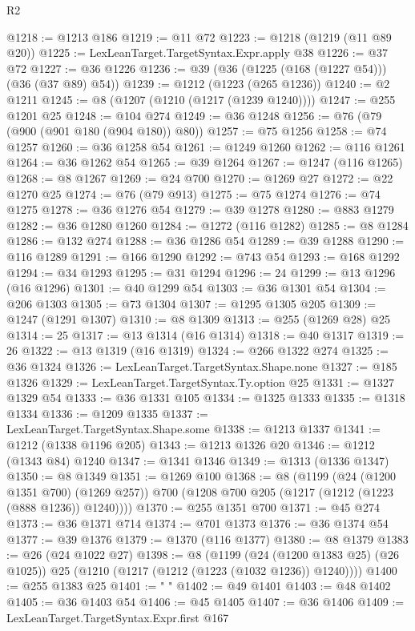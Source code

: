 \begin{lexlean}{R2}
\begin{coremodule}
@1218 := @1213 @186
@1219 := @11 @72
@1223 := @1218 (@1219 (@11 @89 @20))
@1225 := LexLeanTarget.TargetSyntax.Expr.apply @38
@1226 := @37 @72
@1227 := @36 @1226
@1236 := @39 (@36 (@1225 (@168 (@1227 @54))) (@36 (@37 @89) @54))
@1239 := @1212 (@1223 (@265 @1236))
@1240 := @2 @1211
@1245 := @8 (@1207 (@1210 (@1217 (@1239 @1240))))
@1247 := @255 @1201 @25
@1248 := @104 @274
@1249 := @36 @1248
@1256 := @76 (@79 (@900 (@901 @180 (@904 @180)) @80))
@1257 := @75 @1256
@1258 := @74 @1257
@1260 := @36 @1258 @54
@1261 := @1249 @1260
@1262 := @116 @1261
@1264 := @36 @1262 @54
@1265 := @39 @1264
@1267 := @1247 (@116 @1265)
@1268 := @8 @1267
@1269 := @24 @700
@1270 := @1269 @27
@1272 := @22 @1270 @25
@1274 := @76 (@79 @913)
@1275 := @75 @1274
@1276 := @74 @1275
@1278 := @36 @1276 @54
@1279 := @39 @1278
@1280 := @883 @1279
@1282 := @36 @1280 @1260
@1284 := @1272 (@116 @1282)
@1285 := @8 @1284
@1286 := @132 @274
@1288 := @36 @1286 @54
@1289 := @39 @1288
@1290 := @116 @1289
@1291 := @166 @1290
@1292 := @743 @54
@1293 := @168 @1292
@1294 := @34 @1293
@1295 := @31 @1294
@1296 := 24
@1299 := @13 @1296 (@16 @1296)
@1301 := @40 @1299 @54
@1303 := @36 @1301 @54
@1304 := @206 @1303
@1305 := @73 @1304
@1307 := @1295 @1305 @205
@1309 := @1247 (@1291 @1307)
@1310 := @8 @1309
@1313 := @255 (@1269 @28) @25
@1314 := 25
@1317 := @13 @1314 (@16 @1314)
@1318 := @40 @1317
@1319 := 26
@1322 := @13 @1319 (@16 @1319)
@1324 := @266 @1322 @274
@1325 := @36 @1324
@1326 := LexLeanTarget.TargetSyntax.Shape.none
@1327 := @185 @1326
@1329 := LexLeanTarget.TargetSyntax.Ty.option @25
@1331 := @1327 @1329 @54
@1333 := @36 @1331 @105
@1334 := @1325 @1333
@1335 := @1318 @1334
@1336 := @1209 @1335
@1337 := LexLeanTarget.TargetSyntax.Shape.some
@1338 := @1213 @1337
@1341 := @1212 (@1338 @1196 @205)
@1343 := @1213 @1326 @20
@1346 := @1212 (@1343 @84) @1240
@1347 := @1341 @1346
@1349 := @1313 (@1336 @1347)
@1350 := @8 @1349
@1351 := @1269 @100
@1368 := @8
    (@1199
      (@24 (@1200 @1351 @700) (@1269 @257))
      @700
      (@1208 @700 @205 (@1217 (@1212 (@1223 (@888 @1236)) @1240))))
@1370 := @255 @1351 @700
@1371 := @45 @274
@1373 := @36 @1371 @714
@1374 := @701 @1373
@1376 := @36 @1374 @54
@1377 := @39 @1376
@1379 := @1370 (@116 @1377)
@1380 := @8 @1379
@1383 := @26 (@24 @1022 @27)
@1398 := @8
    (@1199
      (@24 (@1200 @1383 @25) (@26 @1025))
      @25
      (@1210 (@1217 (@1212 (@1223 (@1032 @1236)) @1240))))
@1400 := @255 @1383 @25
@1401 := "            "
@1402 := @49 @1401
@1403 := @48 @1402
@1405 := @36 @1403 @54
@1406 := @45 @1405
@1407 := @36 @1406
@1409 := LexLeanTarget.TargetSyntax.Expr.first @167

\end{coremodule}
\end{lexlean}
